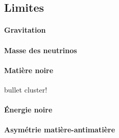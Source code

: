 \subsection{Limites}\label{chapter-MS-MSSM-section-succes_limites-subsec-limites}
\paragraph{Gravitation}
\paragraph{Masse des neutrinos}
\paragraph{Matière noire}
bullet cluster!\cite{Clowe_2006}
\paragraph{Énergie noire}
\paragraph{Asymétrie matière-antimatière}
